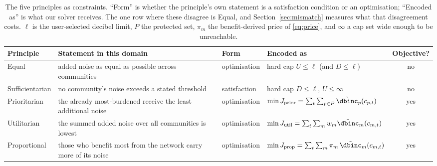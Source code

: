 \begin{table}[t]
\centering
\caption{The five principles as constraints. ``Form'' is whether the principle's own
statement is a satisfaction condition or an optimisation; ``Encoded as'' is what our
solver receives. The one row where these disagree is Equal, and
Section~\ref{sec:mismatch} measures what that disagreement costs. $\ell$ is the
user-selected decibel limit, $P$ the protected set, $\pi_m$ the benefit-derived price
of \eqref{eq:price}, and $\infty$ a cap set wide enough to be unreachable.}
\label{tab:mapping}
\begin{tabular}{llllc}
\toprule
Principle & Statement in this domain & Form & Encoded as & Objective? \\
\midrule
Equal &
  added noise as equal as possible across communities &
  optimisation &
  hard cap $U \le \ell$ (and $D \le \ell$) &
  no \\
Sufficientarian &
  no community's noise exceeds a stated threshold &
  satisfaction &
  hard cap $D \le \ell$, $U \le \infty$ &
  no \\
Prioritarian &
  the already most-burdened receive the least additional noise &
  optimisation &
  $\min J_{\mathrm{prior}} = \sum_{t}\sum_{p \in P} \tilde\dbinc_p(c_{p,t})$ &
  yes \\
Utilitarian &
  the summed added noise over all communities is lowest &
  optimisation &
  $\min J_{\mathrm{util}} = \sum_{t}\sum_{m} w_m \tilde\dbinc_m(c_{m,t})$ &
  yes \\
Proportional &
  those who benefit most from the network carry more of its noise &
  optimisation &
  $\min J_{\mathrm{prop}} = \sum_{t}\sum_{m} \pi_m\,\tilde\dbinc_m(c_{m,t})$ &
  yes \\
\bottomrule
\end{tabular}
\end{table}
